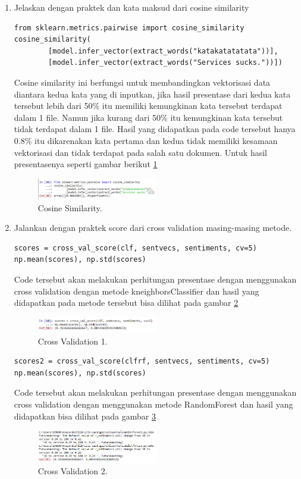 \begin{enumerate}
\item Jelaskan dengan praktek dan kata maksud dari cosine similarity
\begin{verbatim}
from sklearn.metrics.pairwise import cosine_similarity
cosine_similarity(
        [model.infer_vector(extract_words("katakatatatata"))],
        [model.infer_vector(extract_words("Services sucks."))])
\end{verbatim}
Cosine similarity ini berfungsi untuk membandingkan vektorisasi data diantara kedua kata yang di inputkan, jika hasil presentase dari kedua kata tersebut lebih dari 50\% itu memiliki kemungkinan kata tersebut terdapat dalam 1 file. Namun jika kurang dari 50\% itu kemungkinan kata tersebut tidak terdapat dalam 1 file. Hasil yang didapatkan pada code tersebut hanya 0.8\% itu dikarenakan kata pertama dan kedua tidak memiliki kesamaan vektorisasi dan tidak terdapat pada salah satu dokumen. Untuk hasil presentasenya seperti gambar berikut \ref{sim15}
		\begin{figure}[!htbp]
		\centerline{\includegraphics[width=0.5\textwidth]{figures/im/sim15.png}}
		\caption{Cosine Similarity.}
		\label{sim15}
		\end{figure}

\item Jalankan dengan praktek score dari cross validation masing-masing metode.
\begin{verbatim}
scores = cross_val_score(clf, sentvecs, sentiments, cv=5)
np.mean(scores), np.std(scores)
\end{verbatim}
Code tersebut akan melakukan perhitungan presentase dengan menggunakan cross validation dengan metode kneighborsClassifier dan hasil yang didapatkan pada metode tersebut bisa dilihat pada gambar \ref{sim16}
		\begin{figure}[!htbp]
		\centerline{\includegraphics[width=0.5\textwidth]{figures/im/sim16.png}}
		\caption{Cross Validation 1.}
		\label{sim16}
		\end{figure}

\begin{verbatim}
scores2 = cross_val_score(clfrf, sentvecs, sentiments, cv=5)
np.mean(scores), np.std(scores)
\end{verbatim}
Code tersebut akan melakukan perhitungan presentase dengan menggunakan cross validation dengan menggunakan metode RandomForest dan hasil yang didapatkan bisa dilihat pada gambar \ref{sim17}
		\begin{figure}[!htbp]
		\centerline{\includegraphics[width=0.5\textwidth]{figures/im/sim17.png}}
		\caption{Cross Validation 2.}
		\label{sim17}
		\end{figure}


\end{enumerate}

